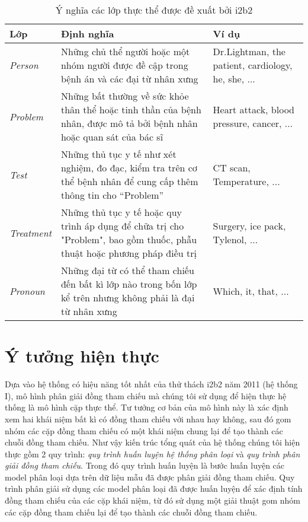 \begin{table}[th]
\centering{}
\caption{Ý nghĩa các lớp thực thể được đề xuất bởi i2b2\label{tab:EntityLabels}}
\footnotesize\sffamily

\begin{tabularx}{\textwidth}{@{}lLP{\raggedright}{0.3}@{}}
\toprule
\textbf{Lớp} & \textbf{Định nghĩa} & \textbf{Ví dụ}\\
\midrule
\emph{Person} & Những chủ thể người hoặc một nhóm người được đề cập trong bệnh án và các đại từ nhân xưng & Dr.Lightman, the patient, cardiology, he, she, ...\\
\emph{Problem} & Những bất thường về sức khỏe thân thể hoặc tinh thần của bệnh nhân, được mô tả bởi bệnh nhân hoặc quan sát của bác sĩ & Heart attack, blood pressure, cancer, ...\\
\emph{Test} & Những thủ tục y tế như xét nghiệm, đo đạc, kiểm tra trên cơ thể bệnh nhân để cung cấp thêm thông tin cho “Problem” & CT scan, Temperature, ...\\
\emph{Treatment} & Những thủ tục y tế hoặc quy trình áp dụng để chữa trị cho "Problem", bao gồm thuốc, phẫu thuật hoặc phương pháp điều trị & Surgery, ice pack, Tylenol, ...\\
\emph{Pronoun} & Những đại từ có thể tham chiếu đến bất kì lớp nào trong bốn lớp kể trên nhưng không phải là đại từ nhân xưng & Which, it, that, ...\\
\bottomrule
\end{tabularx}
\end{table}

\section{Ý tưởng hiện thực\label{ytuonghienthuc}}
Dựa vào hệ thống có hiệu năng tốt nhất của thử thách i2b2 năm 2011 (hệ thống I), mô hình phân giải đồng tham chiếu mà chúng tôi sử dụng để hiện thực hệ thống là mô hình cặp thực thể. Tư tưởng cơ bản của mô hình này là xác định xem hai khái niệm bất kì có đồng tham chiếu với nhau hay không, sau đó gom nhóm các cặp đồng tham chiếu có một khái niệm chung lại để tạo thành các chuỗi đồng tham chiếu. Như vậy kiến trúc tổng quát của hệ thống chúng tôi hiện thực gồm 2 quy trình: \emph{quy trình huấn luyện hệ thống phân loại} và \emph{quy trình phân giải đồng tham chiếu}. Trong đó quy trình huấn luyện là bước huấn luyện các model phân loại dựa trên dữ liệu mẫu đã được phân giải đồng tham chiếu. Quy trình phân giải sử dụng các model phân loại đã được huấn luyện để xác định tính đồng tham chiếu của các cặp khái niệm, từ đó sử dụng một giải thuật gom nhóm các cặp đồng tham chiếu lại để tạo thành các chuỗi đồng tham chiếu.

